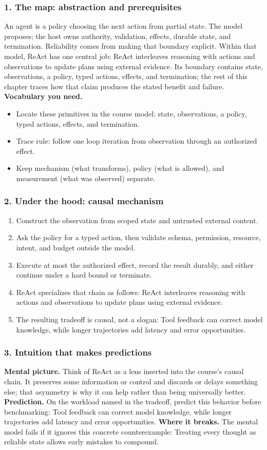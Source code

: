 \subsubsection*{1. The map: abstraction and prerequisites}
An agent is a policy choosing the next action from partial state. The model proposes; the host owns authority, validation, effects, durable state, and termination. Reliability comes from making that boundary explicit.
Within that model, ReAct has one central job: ReAct interleaves reasoning with actions and observations to update plans using external evidence. Its boundary contains state, observations, a policy, typed actions, effects, and termination; the rest of this chapter traces how that claim produces the stated benefit and failure.
\textbf{Vocabulary you need.}\begin{itemize}
\item Locate these primitives in the course model: state, observations, a policy, typed actions, effects, and termination.
\item Trace rule: follow one loop iteration from observation through an authorized effect.
\item Keep mechanism (what transforms), policy (what is allowed), and measurement (what was observed) separate.
\end{itemize}
\subsubsection*{2. Under the hood: causal mechanism}\begin{enumerate}
\item Construct the observation from scoped state and untrusted external content.
\item Ask the policy for a typed action, then validate schema, permission, resource, intent, and budget outside the model.
\item Execute at most the authorized effect, record the result durably, and either continue under a hard bound or terminate.
\item ReAct specializes that chain as follows: ReAct interleaves reasoning with actions and observations to update plans using external evidence.
\item The resulting tradeoff is causal, not a slogan: Tool feedback can correct model knowledge, while longer trajectories add latency and error opportunities.
\end{enumerate}
\subsubsection*{3. Intuition that makes predictions}
\textbf{Mental picture.} Think of ReAct as a lens inserted into the course's causal chain. It preserves some information or control and discards or delays something else; that asymmetry is why it can help rather than being universally better.
\textbf{Prediction.} On the workload named in the tradeoff, predict this behavior before benchmarking: Tool feedback can correct model knowledge, while longer trajectories add latency and error opportunities.
\textbf{Where it breaks.} The mental model fails if it ignores this concrete counterexample: Treating every thought as reliable state allows early mistakes to compound.
